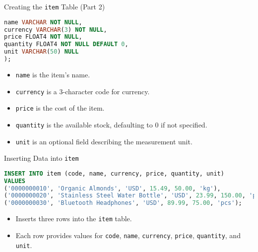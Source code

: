 \documentclass[aspectratio=169, table]{beamer}
\begin{document}
\begin{frame}[fragile]{Creating the \texttt{item} Table (Part 2)}

\begin{lstlisting}[language=Sql]
name VARCHAR NOT NULL,
currency VARCHAR(3) NOT NULL,
price FLOAT4 NOT NULL,
quantity FLOAT4 NOT NULL DEFAULT 0,
unit VARCHAR(50) NULL
);
\end{lstlisting}

\begin{itemize}
\item \texttt{name} is the item's name.
\item \texttt{currency} is a 3-character code for currency.
\item \texttt{price} is the cost of the item.
\item \texttt{quantity} is the available stock, defaulting to 0 if not specified.
\item \texttt{unit} is an optional field describing the measurement unit.
\end{itemize}
\end{frame}

\begin{frame}[fragile]{Inserting Data into \texttt{item}}

\begin{lstlisting}[language=Sql]
INSERT INTO item (code, name, currency, price, quantity, unit)
VALUES
('0000000010', 'Organic Almonds', 'USD', 15.49, 50.00, 'kg'),
('0000000020', 'Stainless Steel Water Bottle', 'USD', 23.99, 150.00, 'pcs'),
('0000000030', 'Bluetooth Headphones', 'USD', 89.99, 75.00, 'pcs');
\end{lstlisting}

\begin{itemize}
\item Inserts three rows into the \texttt{item} table.
\item Each row provides values for \texttt{code}, \texttt{name}, \texttt{currency}, \texttt{price}, \texttt{quantity}, and \texttt{unit}.
\end{itemize}
\end{frame}
\end{document}
